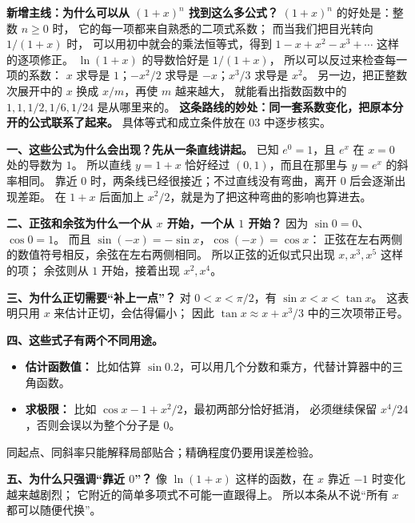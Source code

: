 \clearpage
\begin{explanationbox}

\textbf{新增主线：为什么可以从 $(1+x)^n$ 找到这么多公式？}
$(1+x)^n$ 的好处是：整数 $n\ge0$ 时，
它的每一项都来自熟悉的二项式系数；
而当我们把目光转向 $1/(1+x)$ 时，
可以用初中就会的乘法恒等式，得到
$1-x+x^2-x^3+\cdots$ 这样的逐项修正。
$\ln(1+x)$ 的导数恰好是 $1/(1+x)$，
所以可以反过来检查每一项的系数：
$x$ 求导是 $1$；$-x^2/2$ 求导是 $-x$；$x^3/3$ 求导是 $x^2$。
另一边，把正整数次展开中的 $x$ 换成 $x/m$，再使 $m$ 越来越大，
就能看出指数函数中的 $1,1,1/2,1/6,1/24$ 是从哪里来的。
\textbf{这条路线的妙处：同一套系数变化，把原本分开的公式联系了起来。}
具体等式和成立条件放在 03 中逐步核实。

\textbf{一、这些公式为什么会出现？先从一条直线讲起。}
已知 $e^0=1$，且 $e^x$ 在 $x=0$ 处的导数为 $1$。
所以直线 $y=1+x$ 恰好经过 $(0,1)$，而且在那里与 $y=e^x$ 的斜率相同。
靠近 $0$ 时，两条线已经很接近；不过直线没有弯曲，离开 $0$ 后会逐渐出现差距。
在 $1+x$ 后面加上 $x^2/2$，就是为了把这种弯曲的影响也算进去。


\textbf{二、正弦和余弦为什么一个从 $x$ 开始，一个从 $1$ 开始？}
因为 $\sin0=0$、$\cos0=1$。
而且 $\sin(-x)=-\sin x$，$\cos(-x)=\cos x$：
正弦在左右两侧的数值符号相反，余弦在左右两侧相同。
所以正弦的近似式只出现 $x,x^3,x^5$ 这样的项；
余弦则从 $1$ 开始，接着出现 $x^2,x^4$。


\textbf{三、为什么正切需要“补上一点”？}
对 $0<x<\pi/2$，有 $\sin x<x<\tan x$。
这表明只用 $x$ 来估计正切，会估得偏小；
因此 $\tan x\approx x+x^3/3$ 中的三次项带正号。


\textbf{四、这些式子有两个不同用途。}
\begin{itemize}[leftmargin=*]
\item \textbf{估计函数值：} 比如估算 $\sin0.2$，可以用几个分数和乘方，代替计算器中的三角函数。
\item \textbf{求极限：} 比如 $\cos x-1+x^2/2$，最初两部分恰好抵消，
必须继续保留 $x^4/24$，否则会误以为整个分子是 $0$。
\end{itemize}

同起点、同斜率只能解释局部贴合；精确程度仍要用误差检验。

\textbf{五、为什么只强调“靠近 $0$”？}
像 $\ln(1+x)$ 这样的函数，在 $x$ 靠近 $-1$ 时变化越来越剧烈；
它附近的简单多项式不可能一直跟得上。
所以本条从不说“所有 $x$ 都可以随便代换”。


\end{explanationbox}
